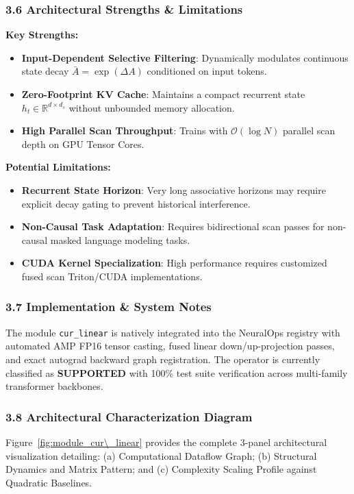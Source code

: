 \subsubsection*{3.6 Architectural Strengths \& Limitations}
\textbf{Key Strengths:}
\begin{itemize}
    \item \textbf{Input-Dependent Selective Filtering}: Dynamically modulates continuous state decay $\bar{A} = \exp(\Delta A)$ conditioned on input tokens.
    \item \textbf{Zero-Footprint KV Cache}: Maintains a compact recurrent state $h_t \in \mathbb{R}^{d \times d_s}$ without unbounded memory allocation.
    \item \textbf{High Parallel Scan Throughput}: Trains with $\mathcal{O}(\log N)$ parallel scan depth on GPU Tensor Cores.
\end{itemize}

\textbf{Potential Limitations:}
\begin{itemize}
    \item \textbf{Recurrent State Horizon}: Very long associative horizons may require explicit decay gating to prevent historical interference.
    \item \textbf{Non-Causal Task Adaptation}: Requires bidirectional scan passes for non-causal masked language modeling tasks.
    \item \textbf{CUDA Kernel Specialization}: High performance requires customized fused scan Triton/CUDA implementations.
\end{itemize}

\subsubsection*{3.7 Implementation \& System Notes}
The module \texttt{cur\_linear} is natively integrated into the NeuralOps registry with automated AMP FP16 tensor casting, fused linear down/up-projection passes, and exact autograd backward graph registration. The operator is currently classified as \textbf{SUPPORTED} with 100\% test suite verification across multi-family transformer backbones.

\subsubsection*{3.8 Architectural Characterization Diagram}
Figure~\ref{fig:module_cur\_linear} provides the complete 3-panel architectural visualization detailing: (a) Computational Dataflow Graph; (b) Structural Dynamics and Matrix Pattern; and (c) Complexity Scaling Profile against Quadratic Baselines.

